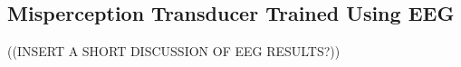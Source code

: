 \subsection{Misperception Transducer Trained Using EEG}
\label{ssec:eeg}

((INSERT A SHORT DISCUSSION OF EEG RESULTS?))

